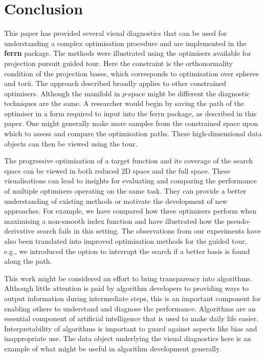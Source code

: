 \hypertarget{conclusion}{%
\section{Conclusion}\label{conclusion}}

This paper has provided several visual diagnostics that can be used for understanding a complex optimisation procedure and are implemented in the \textbf{ferrn} package. The methods were illustrated using the optimisers available for projection pursuit guided tour. Here the constraint is the orthonormality condition of the projection bases, which corresponds to optimisation over spheres and torii. The approach described broadly applies to other constrained optimisers. Although the manifold in \(p\)-space might be different the diagnostic techniques are the same. A researcher would begin by saving the path of the optimiser in a form required to input into the ferrn package, as described in this paper. One might generally make more samples from the constrained space upon which to assess and compare the optimisation paths. These high-dimensional data objects can then be viewed using the tour.

The progressive optimisation of a target function and its coverage of the search space can be viewed in both reduced 2D space and the full space. These visualisations can lead to insights for evaluating and comparing the performance of multiple optimisers operating on the same task. They can provide a better understanding of existing methods or motivate the development of new approaches. For example, we have compared how three optimisers perform when maximising a non-smooth index function and have illustrated how the pseudo-derivative search fails in this setting. The observations from our experiments have also been translated into improved optimisation methods for the guided tour, e.g., we introduced the option to interrupt the search if a better basis is found along the path.

This work might be considered an effort to bring transparency into algorithms. Although little attention is paid by algorithm developers to providing ways to output information during intermediate steps, this is an important component for enabling others to understand and diagnose the performance. Algorithms are an essential component of artificial intelligence that is used to make daily life easier. Interpretability of algorithms is important to guard against aspects like bias and inappropriate use. The data object underlying the visual diagnostics here is an example of what might be useful in algorithm development generally.

